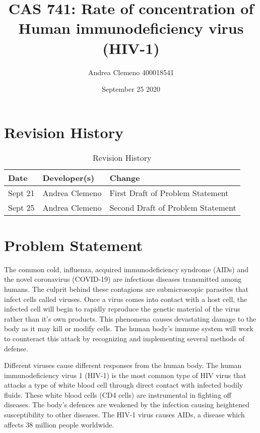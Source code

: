 \documentclass{article}
\title{CAS 741: Rate of concentration of Human immunodeficiency virus (HIV-1)}
\author{Andrea Clemeno      400018541}
\date{September 25 2020}
\begin{document}
\maketitle
\newpage
\section{Revision History}

\begin{table}[hp]
\caption{Revision History} \label{TblRevisionHistory}
\begin{tabularx}{\textwidth}{llX}
\toprule
\textbf{Date} & \textbf{Developer(s)} & \textbf{Change}\\
\midrule
Sept 21 & Andrea Clemeno & First Draft of Problem Statement\\
Sept 25 & Andrea Clemeno & Second Draft of Problem Statement\\
\bottomrule
\end{tabularx}
\end{table}

\iffalse
80 word wrap for TEXmaker
123456789 123456789 123456789 123456789 123456789 123456789 123456789 123456789
\fi

\newpage
\section{Problem Statement}


The common cold, influenza, acquired immunodeficiency syndrome (AIDs) and the novel coronavirus (COVID-19) are infectious diseases transmitted among humans. The culprit behind these contagions are submicroscopic parasites that infect cells called viruses. Once a virus comes into contact with a host cell, the infected cell will begin to rapidly reproduce the genetic material of the virus rather than it’s own products. This phenomena causes devastating damage to the body as it may kill or modify cells. The human body’s immune system will work to counteract this attack by recognizing and implementing several methods of defense. 


Different viruses cause different responses from the human body. The human immunodeficiency virus 1 (HIV-1) is the most common type of HIV virus that attacks a type of white blood cell through direct contact with infected bodily fluids. These white blood cells (CD4 cells) are instrumental in fighting off diseases. The body’s defences are weakened by the infection causing heightened susceptibility to other diseases. The HIV-1 virus causes AIDs, a disease which affects 38 million people worldwide. 
\end{document}
